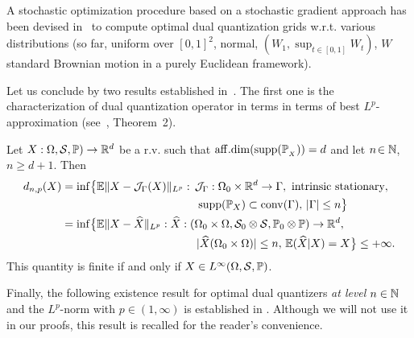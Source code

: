 A stochastic optimization procedure based on a
stochastic gradient approach has been devised in~\cite{dualStat} to  compute optimal dual quantization grids w.r.t. various
distributions  (so far, uniform over $[0,1]^2$, normal, $(W_1,\sup_{t\in[0,1]}  W_t)$, $W$ standard Brownian motion in a purely Euclidean framework). 

Let us conclude by two results established in~\cite{dualStat}. The first one is the   characterization of dual quantization operator in terms  in terms of best
$L^p$-approximation (see~\cite{dualStat}, Theorem~2).

\begin{thm}\label{thm:DQLinkStat}
Let 
$X: \Omega, \mathcal{S},\mathbb{P})\to \mathbb{R}^d$ be a r.v. such that ${\rm aff.dim}({\rm supp}(\mathbb{P}_{_X}))= d$ and let  $n\!\in\mathbb{N}$, $n\ge d+1$. Then
\begin{equation*}
\begin{split}
d_{n,p}(X) & = \inf\bigl\{ \mathbb{E} \lVert X -  \mathcal{J}_\Gamma(X)\rVert_{L^p}: \,
\mathcal{J}_\Gamma: \Omega_0\times \mathbb{R}^d\to\Gamma, \text{ intrinsic stationary},\\
& \qquad\qquad\qquad\qquad\qquad\qquad\operatorname{supp}(\mathbb{P}_X) \subset\operatorname{conv}(\Gamma),\,
\lvert\Gamma\rvert \leq n \bigr\}\\
& = \inf\bigl\{ \mathbb{E} \lVert X -  \widehat X\rVert_{L^p}: \widehat X :(\Omega_0 \times \Omega, {\mathcal{S}}_0\otimes \mathcal{S}, \mathbb{P}_0\otimes\mathbb{P})\to \mathbb{R}^d, \\
& \qquad\qquad\qquad\qquad\qquad\qquad \lvert\widehat
X(\Omega_0\times\Omega)\rvert \leq n,\, \mathbb{E}(\widehat X|X) = X \bigr\}\le +\infty.
\end{split}
\end{equation*}
This quantity is finite if and only if $X\in L^\infty(\Omega, \mathcal{S},\mathbb{P})$.
\end{thm}

Finally, the following existence result 
for optimal dual quantizers  {\em at level $n\in\mathbb{N}$}  and the $L^p$-norm
with $p\in(1,\infty)$  is  established in \cite{dualStat}.
 Although we will not
use it in our proofs, this result is recalled for the reader's convenience.

